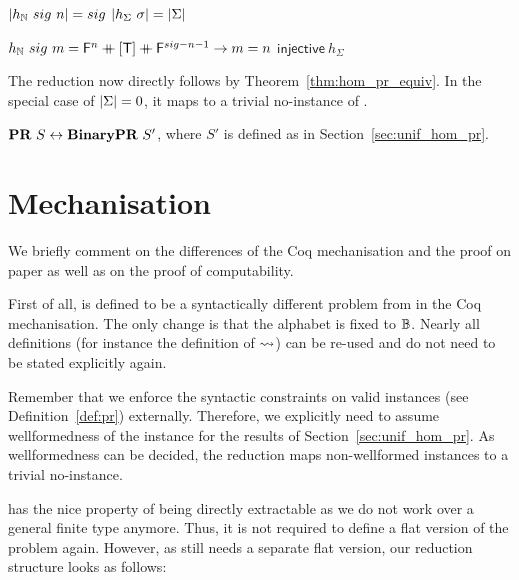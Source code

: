 \begin{fact}[Uniformity]\leavevmode
  \begin{enumerate}
     $|h_{\mathbb{N}}~sig~n| = sig$
    \coqitem[hP_length] $|h_{\Sigma}~\sigma| = |\Sigma|$
  \end{enumerate}
\end{fact}
\pagebreak
\begin{fact}[Injectivity]\leavevmode
  \begin{enumerate}
    \coqitem[hP_inv1] $h_{\mathbb{N}}~sig~m = \mathsf{F}^n \mathbin{+\mkern-10mu+} [\mathsf{T}] \mathbin{+\mkern-10mu+} \mathsf{F}^{sig - n - 1} \rightarrow m = n$
    \coqitem[hP_injective] $\textsf{injective}~h_{\Sigma}$
  \end{enumerate}
\end{fact}

The reduction now directly follows by Theorem~\ref{thm:hom_pr_equiv}.
In the special case of $|\Sigma| = 0$, it maps to a trivial no-instance of \BPR{}. 

\begin{lemma}
  $\textbf{PR}{}~S \leftrightarrow \textbf{BinaryPR}{}~S'$,
  where $S'$ is defined as in Section~\ref{sec:unif_hom_pr}.
\end{lemma}

\section{Mechanisation}
We briefly comment on the differences of the Coq mechanisation and the proof on paper as well as on the proof of computability. 

First of all, \BPR{} is defined to be a syntactically different problem from \PR{} in the Coq mechanisation. The only change is that the alphabet is fixed to $\mathbb{B}$. Nearly all definitions (for instance the definition of $\rightsquigarrow_{}$) can be re-used and do not need to be stated explicitly again.

Remember that we enforce the syntactic constraints on valid \PR{} instances (see Definition~\ref{def:pr}) externally. Therefore, we explicitly need to assume wellformedness of the \PR{} instance for the results of Section~\ref{sec:unif_hom_pr}. As wellformedness can be decided, the reduction maps non-wellformed instances to a trivial no-instance.

\BPR{} has the nice property of being directly extractable as we do not work over a general finite type anymore. Thus, it is not required to define a flat version of the problem again. However, as \PR{} still needs a separate flat version, our reduction structure looks as follows:
\begin{center}
\end{center}

